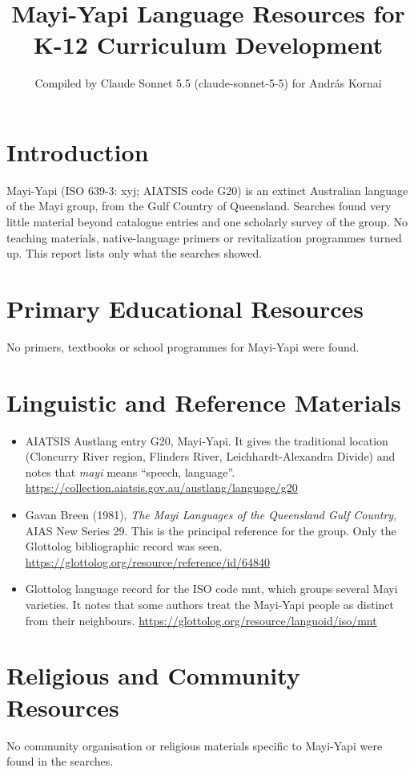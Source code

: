 \documentclass[12pt]{article}
\title{Mayi-Yapi Language Resources for K-12 Curriculum Development}
\author{Compiled by Claude Sonnet 5.5 (claude-sonnet-5-5) for Andr\'as Kornai}
\date{}
\begin{document}
\maketitle

\section{Introduction}
Mayi-Yapi (ISO 639-3: xyj; AIATSIS code G20) is an extinct Australian language of the Mayi group, from the Gulf Country of Queensland. Searches found very little material beyond catalogue entries and one scholarly survey of the group. No teaching materials, native-language primers or revitalization programmes turned up. This report lists only what the searches showed.

\section{Primary Educational Resources}
No primers, textbooks or school programmes for Mayi-Yapi were found.

\section{Linguistic and Reference Materials}
\begin{itemize}
\item AIATSIS Austlang entry G20, Mayi-Yapi. It gives the traditional location (Cloncurry River region, Flinders River, Leichhardt-Alexandra Divide) and notes that \emph{mayi} means ``speech, language''. \url{https://collection.aiatsis.gov.au/austlang/language/g20}
\item Gavan Breen (1981), \emph{The Mayi Languages of the Queensland Gulf Country}, AIAS New Series 29. This is the principal reference for the group. Only the Glottolog bibliographic record was seen. \url{https://glottolog.org/resource/reference/id/64840}
\item Glottolog language record for the ISO code mnt, which groups several Mayi varieties. It notes that some authors treat the Mayi-Yapi people as distinct from their neighbours. \url{https://glottolog.org/resource/languoid/iso/mnt}
\end{itemize}

\section{Religious and Community Resources}
No community organisation or religious materials specific to Mayi-Yapi were found in the searches.
\end{document}
